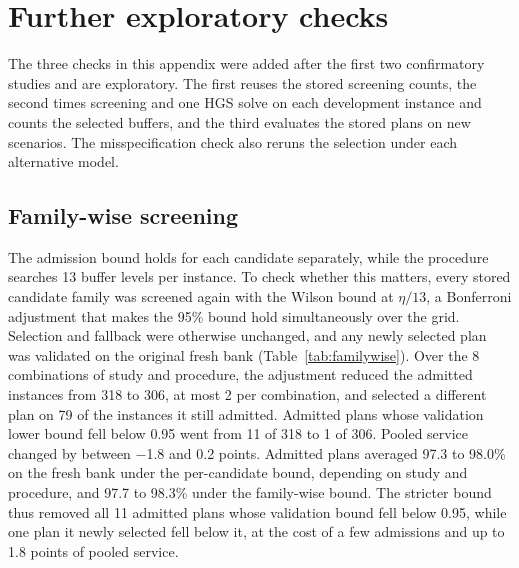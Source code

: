 \section{Further exploratory checks}\label{sec:checks}

The three checks in this appendix were added after the first two confirmatory studies and are exploratory. The first reuses the stored screening counts, the second times screening and one HGS solve on each development instance and counts the selected buffers, and the third evaluates the stored plans on new scenarios. The misspecification check also reruns the selection under each alternative model.

\subsection{Family-wise screening}\label{sec:familywise}

The admission bound holds for each candidate separately, while the procedure searches 13 buffer levels per instance. To check whether this matters, every stored candidate family was screened again with the Wilson bound at $\eta/13$, a Bonferroni adjustment that makes the 95\% bound hold simultaneously over the grid. Selection and fallback were otherwise unchanged, and any newly selected plan was validated on the original fresh bank (Table~\ref{tab:familywise}). Over the 8 combinations of study and procedure, the adjustment reduced the admitted instances from 318 to 306, at most 2 per combination, and selected a different plan on 79 of the instances it still admitted. Admitted plans whose validation lower bound fell below 0.95 went from 11 of 318 to 1 of 306. Pooled service changed by between $-$1.8 and 0.2 points. Admitted plans averaged 97.3 to 98.0\% on the fresh bank under the per-candidate bound, depending on study and procedure, and 97.7 to 98.3\% under the family-wise bound. The stricter bound thus removed all 11 admitted plans whose validation bound fell below 0.95, while one plan it newly selected fell below it, at the cost of a few admissions and up to 1.8 points of pooled service.

